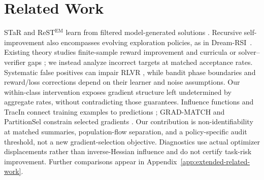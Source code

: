 \section{Related Work}
\label{sec:related}

STaR and ReST$^{\mathrm{EM}}$ learn from filtered model-generated solutions
\citep{zelikman2022star,singh2023restem}. Recursive self-improvement also
encompasses evolving exploration policies, as in
Dream-RSI~\citep{zheng2026dreamrsi}. Existing theory studies finite-sample
reward improvement and curricula \citep{liu2026taskcentric} or solver--verifier
gaps \citep{sun2025solververifier}; we instead analyze incorrect targets at
matched acceptance rates. Systematic false positives can impair RLVR
\citep{egashira2026systematic}, while bandit phase boundaries
\citep{rad2026rate} and reward/loss corrections
\citep{cai2025noisy,natarajan2013noisy,patrini2017correction} depend on their
learner and noise assumptions. Our within-class intervention exposes gradient
structure left undetermined by aggregate rates, without contradicting those
guarantees. Influence functions and TracIn connect training examples to
predictions \citep{koh2017influence,pruthi2020tracin}; GRAD-MATCH and
PartitionSel constrain selected gradients
\citep{killamsetty2021gradmatch,agrawal2026partitionsel}. Our contribution is
non-identifiability at matched summaries, population-flow separation, and a
policy-specific audit threshold, not a new gradient-selection objective.
Diagnostics use actual optimizer displacements rather than inverse-Hessian
influence and do not certify task-risk improvement. Further comparisons
appear in Appendix~\ref{app:extended-related-work}.
